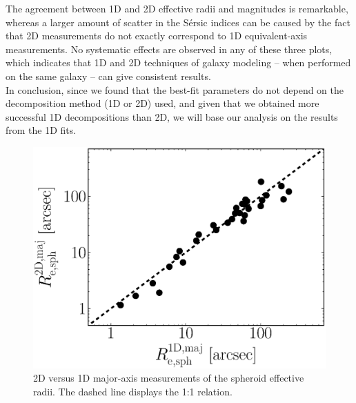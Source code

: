 \documentclass[preprint2]{emulateapj}
\begin{document}
The agreement between 1D and 2D effective radii and magnitudes is remarkable, 
whereas a larger amount of scatter in the S\'ersic indices can be caused by the fact that 
2D measurements do not exactly correspond to 1D equivalent-axis measurements. 
No systematic effects are observed in any of these three plots, 
which indicates that 1D and 2D techniques of galaxy modeling -- when performed on the same galaxy -- 
can give consistent results. \\
In conclusion, since we found that the best-fit parameters do not depend on the decomposition method (1D or 2D) used, 
and given that we obtained more successful 1D decompositions than 2D, 
we will base our analysis on the results from the 1D fits.


\begin{figure}[h]
\begin{center}
\includegraphics[width=\columnwidth]{comparison_r_e.eps} 
\caption{2D versus 1D major-axis measurements of the spheroid effective radii. 
The dashed line displays the 1:1 relation.}
\label{fig:re1d2d}
\end{center}
\end{figure}
\end{document}
